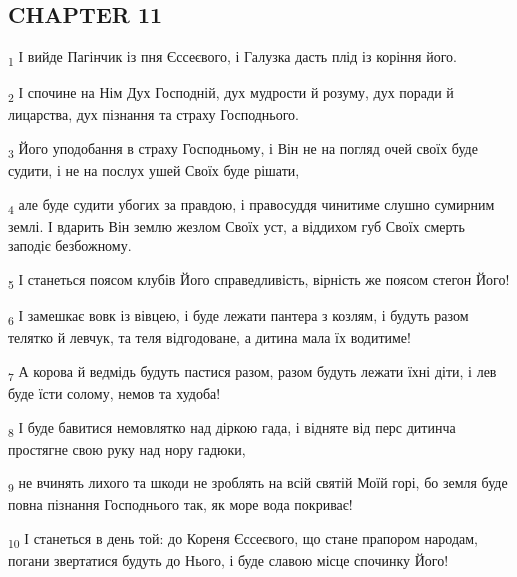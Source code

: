 \subsection{CHAPTER 11}
\begin{tcolorbox}
\textsubscript{1} І вийде Пагінчик із пня Єссеєвого, і Галузка дасть плід із коріння його.
\end{tcolorbox}
\begin{tcolorbox}
\textsubscript{2} І спочине на Нім Дух Господній, дух мудрости й розуму, дух поради й лицарства, дух пізнання та страху Господнього.
\end{tcolorbox}
\begin{tcolorbox}
\textsubscript{3} Його уподобання в страху Господньому, і Він не на погляд очей своїх буде судити, і не на послух ушей Своїх буде рішати,
\end{tcolorbox}
\begin{tcolorbox}
\textsubscript{4} але буде судити убогих за правдою, і правосуддя чинитиме слушно сумирним землі. І вдарить Він землю жезлом Своїх уст, а віддихом губ Своїх смерть заподіє безбожному.
\end{tcolorbox}
\begin{tcolorbox}
\textsubscript{5} І станеться поясом клубів Його справедливість, вірність же поясом стегон Його!
\end{tcolorbox}
\begin{tcolorbox}
\textsubscript{6} І замешкає вовк із вівцею, і буде лежати пантера з козлям, і будуть разом телятко й левчук, та теля відгодоване, а дитина мала їх водитиме!
\end{tcolorbox}
\begin{tcolorbox}
\textsubscript{7} А корова й ведмідь будуть пастися разом, разом будуть лежати їхні діти, і лев буде їсти солому, немов та худоба!
\end{tcolorbox}
\begin{tcolorbox}
\textsubscript{8} І буде бавитися немовлятко над діркою гада, і відняте від перс дитинча простягне свою руку над нору гадюки,
\end{tcolorbox}
\begin{tcolorbox}
\textsubscript{9} не вчинять лихого та шкоди не зроблять на всій святій Моїй горі, бо земля буде повна пізнання Господнього так, як море вода покриває!
\end{tcolorbox}
\begin{tcolorbox}
\textsubscript{10} І станеться в день той: до Кореня Єссеєвого, що стане прапором народам, погани звертатися будуть до Нього, і буде славою місце спочинку Його!
\end{tcolorbox}
